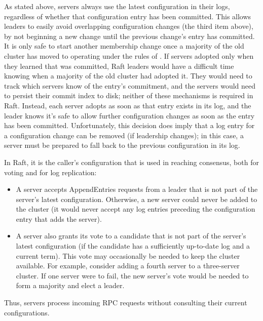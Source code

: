 As stated above, servers always use the latest configuration in their
logs, regardless of whether that configuration entry has been committed.
This allows leaders to easily avoid overlapping configuration changes
(the third item above), by not beginning a new change until the previous
change's entry has committed. It is only safe to start another membership
change once a majority of the old cluster has moved to operating under
the rules of \cnew{}. If servers adopted \cnew{} only when they
learned that \cnew{} was committed, Raft leaders would have a difficult
time knowing when a majority of the old cluster had adopted it. They
would need to track which servers know of the entry's commitment, and
the servers would need to persist their commit index to disk; neither of
these mechanisms is required in Raft. Instead, each server
adopts \cnew{} as soon as that entry exists in its log, and the leader
knows it's safe to allow further configuration changes as soon as the
\cnew{} entry has been committed. Unfortunately, this decision does
imply that a log entry for a configuration change can be removed (if
leadership changes); in this case, a server must be prepared to fall
back to the previous configuration in its log.

In Raft, it is the caller's configuration that is used in reaching
consensus, both for voting and for log replication:
%
\begin{itemize}
%
\item A server accepts AppendEntries requests from a leader that
is not part of the server's latest configuration. Otherwise, a new server
could never be added to the cluster (it would never accept any log entries
preceding the configuration entry that adds the server).
%
\item A server also grants its vote to a candidate that is not
part of the server's latest configuration (if the candidate has a
sufficiently up-to-date log and a current term). This vote may
occasionally be needed to keep the cluster available. For example,
consider adding a fourth server to a three-server cluster. If one server
were to fail, the new server's vote would be needed to form a majority
and elect a leader.
%
\end{itemize}
%
Thus, servers process incoming RPC requests without consulting their
current configurations.

